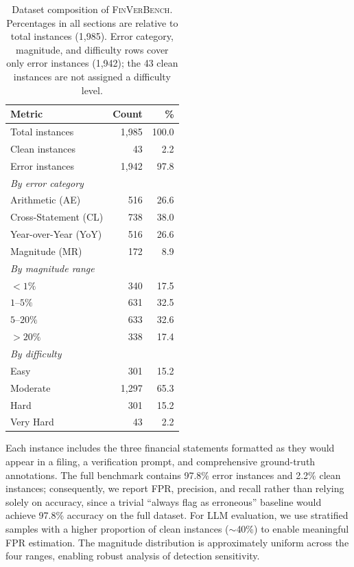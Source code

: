 \documentclass[11pt]{article}
\newcommand{\benchmark}{\textsc{FinVerBench}}
\begin{document}
\begin{table}[t]
\centering
\small
\caption{Dataset composition of \benchmark{}.
Percentages in all sections are relative to total instances (1,985).
Error category, magnitude, and difficulty rows cover only error instances (1,942); the 43 clean instances are not assigned a difficulty level.}
\label{tab:dataset_stats}
\begin{tabular}{lrr}
\toprule
\textbf{Metric} & \textbf{Count} & \textbf{\%} \\
\midrule
Total instances & 1,985 & 100.0 \\
Clean instances & 43 & 2.2 \\
Error instances & 1,942 & 97.8 \\
\midrule
\multicolumn{3}{l}{\emph{By error category}} \\
\quad Arithmetic (AE) & 516 & 26.6 \\
\quad Cross-Statement (CL) & 738 & 38.0 \\
\quad Year-over-Year (YoY) & 516 & 26.6 \\
\quad Magnitude (MR) & 172 & 8.9 \\
\midrule
\multicolumn{3}{l}{\emph{By magnitude range}} \\
\quad $<1\%$ & 340 & 17.5 \\
\quad $1$--$5\%$ & 631 & 32.5 \\
\quad $5$--$20\%$ & 633 & 32.6 \\
\quad $>20\%$ & 338 & 17.4 \\
\midrule
\multicolumn{3}{l}{\emph{By difficulty}} \\
\quad Easy & 301 & 15.2 \\
\quad Moderate & 1,297 & 65.3 \\
\quad Hard & 301 & 15.2 \\
\quad Very Hard & 43 & 2.2 \\
\bottomrule
\end{tabular}
\end{table}

Each instance includes the three financial statements formatted as they would appear in a filing, a verification prompt, and comprehensive ground-truth annotations.
The full benchmark contains 97.8\% error instances and 2.2\% clean instances; consequently, we report FPR, precision, and recall rather than relying solely on accuracy, since a trivial ``always flag as erroneous'' baseline would achieve 97.8\% accuracy on the full dataset.
For LLM evaluation, we use stratified samples with a higher proportion of clean instances ($\sim$40\%) to enable meaningful FPR estimation.
The magnitude distribution is approximately uniform across the four ranges, enabling robust analysis of detection sensitivity.
\end{document}
